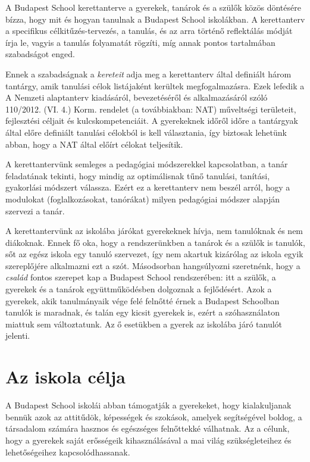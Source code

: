 A Budapest School kerettanterve a gyerekek, tanárok és a szülők közös döntésére bízza, hogy mit és hogyan tanulnak a Budapest School iskolákban. A kerettanterv a specifikus célkitűzés-tervezés, a tanulás, és az arra történő reflektálás módját írja le, vagyis a tanulás folyamatát rögzíti, míg annak pontos tartalmában szabadságot enged.

Ennek a szabadságnak a \emph{kereteit} adja meg a kerettanterv által definiált három tantárgy, amik tanulási célok listájaként kerültek megfogalmazásra. Ezek lefedik a A Nemzeti alaptanterv kiadásáról, bevezetéséről és alkalmazásáról szóló 110/2012. (VI. 4.) Korm. rendelet (a továbbiakban: NAT) műveltségi területeit, fejlesztési céljait és kulcskompetenciáit. A gyerekeknek időről időre a tantárgyak által előre definiált tanulási célokból is kell választania, így biztosak lehetünk abban, hogy a NAT által előírt célokat teljesítik. 

A kerettantervünk semleges a pedagógiai módszerekkel kapcsolatban, a tanár feladatának tekinti, hogy mindig az optimálisnak tűnő tanulási, tanítási, gyakorlási módszert válassza. Ezért ez a kerettanterv nem beszél arról, hogy a modulokat (foglalkozásokat, tanórákat) milyen pedagógiai módszer alapján szervezi a tanár. 

A kerettantervünk az iskolába járókat gyerekeknek hívja, nem tanulóknak és nem diákoknak. Ennek fő oka, hogy a rendszerünkben a tanárok és a szülők is tanulók, sőt az egész iskola egy tanuló szervezet, így nem akartuk  kizárólag az iskola egyik szereplőjére alkalmazni ezt a szót. Másodsorban hangsúlyozni szeretnénk, hogy a \emph{család} fontos szerepet kap a Budapest School rendszerében: itt a szülők, a gyerekek és a tanárok együttműködésben dolgoznak a fejlődésért. Azok a gyerekek, akik tanulmányaik vége felé felnőtté érnek a Budapest Schoolban tanulók is maradnak, és talán egy kicsit gyerekek is, ezért a szóhasználaton miattuk sem változtatunk. Az ő esetükben a gyerek az iskolába járó tanulót jelenti.

\section{Az iskola célja}

A Budapest School iskolái abban támogatják a gyerekeket, hogy kialakuljanak bennük azok az attitűdök, képességek és szokások, amelyek segítségével boldog, a társadalom számára hasznos és egészséges felnőttekké válhatnak. Az a célunk, hogy a gyerekek saját erősségeik kihasználásával a mai világ szükségleteihez és lehetőségeihez kapcsolódhassanak.

